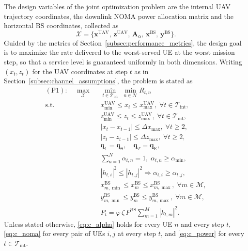 \documentclass[conference]{IEEEtran}
\begin{document}
The design variables of the joint optimization problem are the internal
UAV trajectory coordinates, the downlink NOMA power allocation matrix and
the horizontal BS coordinates, collected as
\begin{equation}
\label{eq:variable_set}
\mathcal{X}=\big\{\mathbf{x}^{\mathrm{UAV}},\,\mathbf{z}^{\mathrm{UAV}},\,
\mathbf{A}_{\alpha},\,\mathbf{x}^{\mathrm{BS}},\,
\mathbf{y}^{\mathrm{BS}}\big\}.
\end{equation}
Guided by the metrics of Section~\ref{subsec:performance_metrics}, the
design goal is to maximize the rate delivered to the worst-served UE at
the worst mission step, so that a service level is guaranteed uniformly
in both dimensions. Writing $(x_{t},z_{t})$ for the UAV coordinates at
step $t$ as in Section~\ref{subsec:channel_assumptions}, the problem is
stated as
\begin{subequations}
\label{eq:P1}
\begin{align}
(\mathrm{P1}):\quad
\max_{\mathcal{X}}\;\;
& \min_{t\in\mathcal{T}_{\mathrm{int}}}\;\min_{n\in\mathcal{N}} R_{t,n}
  \label{eq:P1_obj}\\
\mathrm{s.t.}\;\;
& x_{\min}^{\mathrm{UAV}}\le x_{t}\le x_{\max}^{\mathrm{UAV}},
  \;\forall t\in\mathcal{T}_{\mathrm{int}}, \label{eq:c_xbound}\\
& z_{\min}^{\mathrm{UAV}}\le z_{t}\le z_{\max}^{\mathrm{UAV}},
  \;\forall t\in\mathcal{T}_{\mathrm{int}}, \label{eq:c_zbound}\\
& |x_{t}-x_{t-1}|\le\Delta x_{\max},\;\forall t\ge2,
  \label{eq:c_movex}\\
& |z_{t}-z_{t-1}|\le\Delta z_{\max},\;\forall t\ge2,
  \label{eq:c_movez}\\
& \mathbf{q}_{1}=\mathbf{q}_{\mathrm{S}},\quad
  \mathbf{q}_{T}=\mathbf{q}_{\mathrm{E}}, \label{eq:c_endpoints}\\
& \sum_{n=1}^{N}\alpha_{t,n}=1,\;\alpha_{t,n}\ge\alpha_{\min},
  \label{eq:c_alpha}\\
& |h_{t,i}|^{2}\le|h_{t,j}|^{2}\Rightarrow\alpha_{t,i}\ge\alpha_{t,j},
  \label{eq:c_noma}\\
& x_{m,\min}^{\mathrm{BS}}\le x_{m}^{\mathrm{BS}}
  \le x_{m,\max}^{\mathrm{BS}},\;\forall m\in\mathcal{M},
  \label{eq:c_bsx}\\
& y_{m,\min}^{\mathrm{BS}}\le y_{m}^{\mathrm{BS}}
  \le y_{m,\max}^{\mathrm{BS}},\;\forall m\in\mathcal{M},
  \label{eq:c_bsy}\\
& P_{t}=\varphi\,\zeta\,P^{\mathrm{BS}}
  \sum_{m=1}^{M}|k_{t,m}|^{2}. \label{eq:c_power}
\end{align}
\end{subequations}
Unless stated otherwise, \eqref{eq:c_alpha} holds for every UE $n$ and
every step $t$, \eqref{eq:c_noma} for every pair of UEs $i,j$ at every
step $t$, and \eqref{eq:c_power} for every
$t\in\mathcal{T}_{\mathrm{int}}$.
\end{document}
